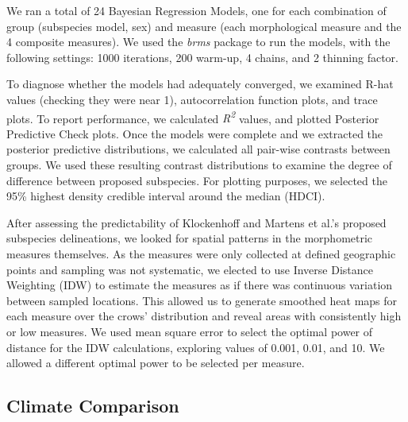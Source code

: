 \documentclass[10pt,a4paper]{article}
\begin{document}
We ran a total of 24 Bayesian Regression Models, one for each combination of group (subspecies model, sex) and measure (each morphological measure and the 4 composite measures).
We used the \emph{brms} package to run the models, with the following settings: 1000 iterations, 200 warm-up, 4 chains, and 2 thinning factor.

To diagnose whether the models had adequately converged, we examined R-hat values (checking they were near 1), autocorrelation function plots, and trace plots.
To report performance, we calculated \emph{R\textsuperscript{2}} values, and plotted Posterior Predictive Check plots.
Once the models were complete and we extracted the posterior predictive distributions, we calculated all pair-wise contrasts between groups.
We used these resulting contrast distributions to examine the degree of difference between proposed subspecies.
For plotting purposes, we selected the 95\% highest density credible interval around the median (HDCI).

After assessing the predictability of Klockenhoff and Martens et al.'s proposed subspecies delineations, we looked for spatial patterns in the morphometric measures themselves.
As the measures were only collected at defined geographic points and sampling was not systematic, we elected to use Inverse Distance Weighting (IDW) to estimate the measures as if there was continuous variation between sampled locations.
This allowed us to generate smoothed heat maps for each measure over the crows' distribution and reveal areas with consistently high or low measures.
We used mean square error to select the optimal power of distance for the IDW calculations, exploring values of 0.001, 0.01, and 10.
We allowed a different optimal power to be selected per measure.

\subsection{Climate Comparison}\label{climate-comparison}
\end{document}
